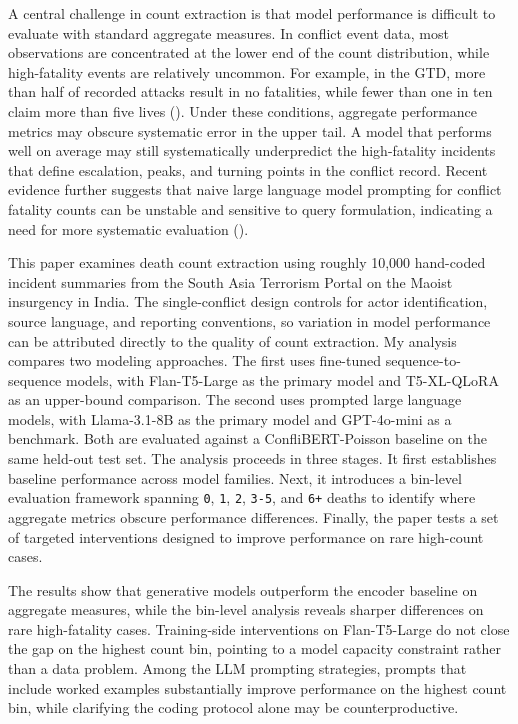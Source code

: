 \documentclass[
  11pt,
]{article}
\begin{document}
A central challenge in count extraction is that model performance is
difficult to evaluate with standard aggregate measures. In conflict
event data, most observations are concentrated at the lower end of the
count distribution, while high-fatality events are relatively uncommon.
For example, in the GTD, more than half of recorded attacks result in no
fatalities, while fewer than one in ten claim more than five lives
(). Under these
conditions, aggregate performance metrics may obscure systematic error
in the upper tail. A model that performs well on average may still
systematically underpredict the high-fatality incidents that define
escalation, peaks, and turning points in the conflict record. Recent
evidence further suggests that naive large language model prompting for
conflict fatality counts can be unstable and sensitive to query
formulation, indicating a need for more systematic evaluation
().

This paper examines death count extraction using roughly 10,000
hand-coded incident summaries from the South Asia Terrorism Portal on
the Maoist insurgency in India. The single-conflict design controls for
actor identification, source language, and reporting conventions, so
variation in model performance can be attributed directly to the quality
of count extraction. My analysis compares two modeling approaches. The
first uses fine-tuned sequence-to-sequence models, with Flan-T5-Large as
the primary model and T5-XL-QLoRA as an upper-bound comparison. The
second uses prompted large language models, with Llama-3.1-8B as the
primary model and GPT-4o-mini as a benchmark. Both are evaluated against
a ConfliBERT-Poisson baseline on the same held-out test set. The
analysis proceeds in three stages. It first establishes baseline
performance across model families. Next, it introduces a bin-level
evaluation framework spanning \texttt{0}, \texttt{1}, \texttt{2},
\texttt{3-5}, and \texttt{6+} deaths to identify where aggregate metrics
obscure performance differences. Finally, the paper tests a set of
targeted interventions designed to improve performance on rare
high-count cases.

The results show that generative models outperform the encoder baseline
on aggregate measures, while the bin-level analysis reveals sharper
differences on rare high-fatality cases. Training-side interventions on
Flan-T5-Large do not close the gap on the highest count bin, pointing to
a model capacity constraint rather than a data problem. Among the LLM
prompting strategies, prompts that include worked examples substantially
improve performance on the highest count bin, while clarifying the
coding protocol alone may be counterproductive.
\end{document}
